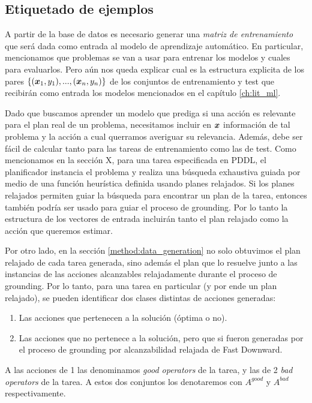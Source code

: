 \subsection{Etiquetado de ejemplos}

A partir de la base de datos es necesario generar una \emph{matriz de entrenamiento} que será dada como entrada al modelo de aprendizaje automático. En particular, mencionamos que problemas se van a usar para entrenar los modelos y cuales para evaluarlos. Pero aún nos queda explicar cual es la estructura explicita de los pares $\{(\boldsymbol{x}_1, y_1), ..., (\boldsymbol{x}_n, y_n)\}$ de los conjuntos de entrenamiento y test que recibirán como entrada los modelos mencionados en el capítulo \ref{ch:lit_ml}.

Dado que buscamos aprender un modelo que prediga si una acción es relevante para el plan real de un problema, necesitamos incluir en $\boldsymbol{x}$ información de tal problema y la acción a cual querramos averiguar su relevancia. Además, debe ser fácil de calcular tanto para las tareas de entrenamiento como las de test. Como mencionamos en la sección X, para una tarea especificada en PDDL, el planificador instancia el problema y realiza una búsqueda exhaustiva guiada por medio de una función heurística definida usando planes relajados. Si los planes relajados permiten guiar la búsqueda para encontrar un plan de la tarea, entonces también podría ser usado para guiar el proceso de grounding. Por lo tanto la estructura de los vectores de entrada incluirán tanto el plan relajado como la acción que queremos estimar.

Por otro lado, en la sección \ref{method:data_generation} no solo obtuvimos el plan relajado de cada tarea generada, sino además el plan que lo resuelve junto a las instancias de las acciones alcanzables relajadamente durante el proceso de grounding. Por lo tanto, para una tarea en particular (y por ende un plan relajado), se pueden identificar dos clases distintas de acciones generadas:

\begin{enumerate}
    \item Las acciones que pertenecen a la solución (óptima o no).
    \item Las acciones que no pertenece a la solución, pero que si fueron generadas por el proceso de grounding por alcanzabilidad relajada de Fast Downward.
\end{enumerate}

A las acciones de 1 las denominamos \emph{good operators} de la tarea, y las de 2 \emph{bad operators} de la tarea. A estos dos conjuntos los denotaremos con $A^{good}$ y $A^{bad}$ respectivamente.


